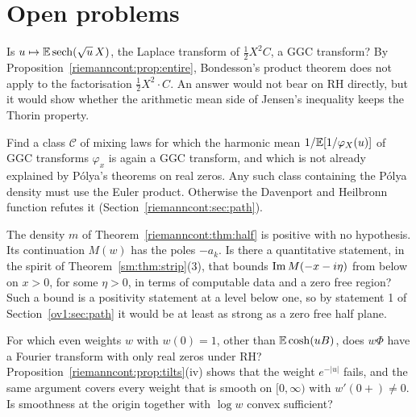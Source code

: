 \section{Open problems}\label{riemanncont:sec:open}

\begin{problem}\label{riemanncont:prob:arith}
Is $u\mapsto\mathbb{E}\operatorname{sech}(\sqrt u\,X)$, the Laplace transform of $\frac12X^2C$, a GGC transform? By Proposition~\ref{riemanncont:prop:entire}, Bondesson's product theorem does not apply to the factorisation $\frac12X^2\cdot C$. An answer would not bear on RH directly, but it would show whether the arithmetic mean side of Jensen's inequality keeps the Thorin property.
\end{problem}

\begin{problem}\label{riemanncont:prob:hm}
Find a class $\mathcal C$ of mixing laws for which the harmonic mean $1/\mathbb{E}[1/\varphi_X(u)]$ of GGC transforms $\varphi_x$ is again a GGC transform, and which is not already explained by P\'olya's theorems on real zeros. Any such class containing the P\'olya density must use the Euler product. Otherwise the Davenport and Heilbronn function refutes it (Section~\ref{riemanncont:sec:path}).
\end{problem}

\begin{problem}\label{riemanncont:prob:half}
The density $m$ of Theorem~\ref{riemanncont:thm:half} is positive with no hypothesis. Its continuation $M(w)$ has the poles $-a_k$. Is there a quantitative statement, in the spirit of Theorem~\ref{sm:thm:strip}(3), that bounds $\operatorname{Im} M(-x-i\eta)$ from below on $x>0$, for some $\eta>0$, in terms of computable data and a zero free region? Such a bound is a positivity statement at a level below one, so by statement 1 of Section~\ref{ov1:sec:path} it would be at least as strong as a zero free half plane.
\end{problem}

\begin{problem}\label{riemanncont:prob:tilt}
For which even weights $w$ with $w(0)=1$, other than $\mathbb{E}\cosh(uB)$, does $w\Phi$ have a Fourier transform with only real zeros under RH? Proposition~\ref{riemanncont:prop:tilts}(iv) shows that the weight $e^{-|u|}$ fails, and the same argument covers every weight that is smooth on $[0,\infty)$ with $w'(0+)\ne0$. Is smoothness at the origin together with $\log w$ convex sufficient?
\end{problem}

